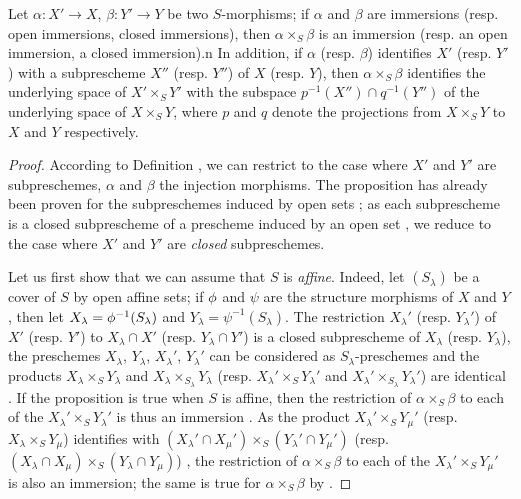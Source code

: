 \begin{prop}[4.3.1]
\label{1.4.3.1}
Let $\alpha:X'\to X$, $\beta:Y'\to Y$ be two $S$-morphisms; if $\alpha$ and $\beta$ are immersions (resp. open immersions, closed immersions), then $\alpha\times_S\beta$ is an immersion (resp. an open immersion, a closed immersion).n
In addition, if $\alpha$ (resp. $\beta$) identifies $X'$ (resp. $Y'$) with a subprescheme $X''$ (resp. $Y''$) of $X$ (resp. $Y$), then $\alpha\times_S\beta$ identifies the underlying space of $X'\times_S Y'$ with the subspace $p^{-1}(X'')\cap q^{-1}(Y'')$ of the underlying space of $X\times_S Y$, where $p$ and $q$ denote the projections from $X\times_S Y$ to $X$ and $Y$ respectively.
\end{prop}

\begin{proof}
\label{proof-1.4.3.1}
According to Definition , we can restrict to the case where $X'$ and $Y'$ are subpreschemes, $\alpha$ and $\beta$ the injection morphisms. The proposition has already been proven for the subpreschemes induced by open sets ; as each subprescheme is a closed subprescheme of a prescheme induced by an open set , we reduce to the case where $X'$ and $Y'$ are \emph{closed} subpreschemes.

Let us first show that we can assume that $S$ is \emph{affine}.
Indeed, let $(S_\lambda)$ be a cover of $S$ by open affine sets; if $\phi$ and $\psi$ are the structure morphisms of $X$ and $Y$, then let $X_\lambda=\phi^{-1}(S_\lambda)$ and $Y_\lambda=\psi^{-1}(S_\lambda)$.
The restriction $X_\lambda'$ (resp. $Y_\lambda'$) of $X'$ (resp. $Y'$) to $X_\lambda\cap X'$ (resp. $Y_\lambda\cap Y'$) is a closed subprescheme of $X_\lambda$ (resp. $Y_\lambda$), the preschemes $X_\lambda$, $Y_\lambda$, $X_\lambda'$, $Y_\lambda'$ can be considered as $S_\lambda$-preschemes and the products $X_\lambda\times_S Y_\lambda$ and $X_\lambda\times_{S_\lambda}Y_\lambda$ (resp. $X_\lambda'\times_S Y_\lambda'$ and $X_\lambda'\times_{S_\lambda}Y_\lambda'$) are identical .
If the proposition is true when $S$ is affine, then the restriction of $\alpha\times_S\beta$ to each of the $X_\lambda'\times_S Y_\lambda'$ is thus an immersion .
As the product $X_\lambda'\times_S Y_\mu'$ (resp. $X_\lambda\times_S Y_\mu$) identifies with $(X_\lambda'\cap X_\mu')\times_S(Y_\lambda'\cap Y_\mu')$ (resp. $(X_\lambda\cap X_\mu)\times_S(Y_\lambda\cap Y_\mu)$) , the restriction of $\alpha\times_S\beta$
to each of the $X_\lambda'\times_S Y_\mu'$ is also an immersion; the same is true for $\alpha\times_S\beta$ by .


\end{proof}
